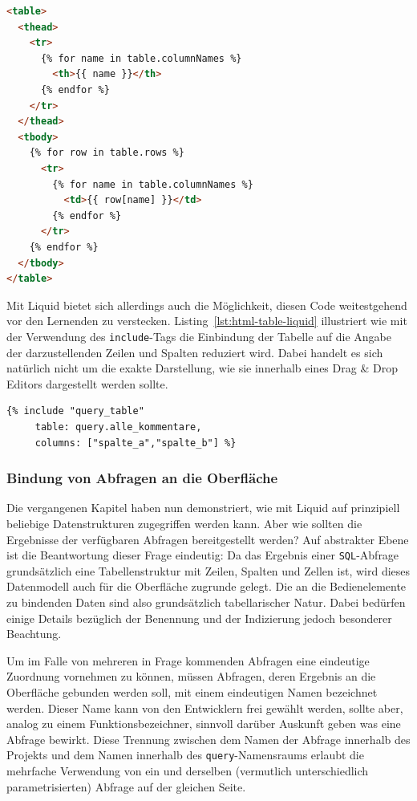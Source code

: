\begin{lstlisting}[language=html,float=h,caption={Code für eine \texttt{HTML}-Tabelle mit Datenanbindung}, label={lst:html-table-pure}]
<table>
  <thead>
    <tr>
      {% for name in table.columnNames %}
        <th>{{ name }}</th>
      {% endfor %}
    </tr>
  </thead>
  <tbody>
    {% for row in table.rows %}
      <tr>
        {% for name in table.columnNames %}
          <td>{{ row[name] }}</td>
        {% endfor %}
      </tr>
    {% endfor %}
  </tbody>
</table>
\end{lstlisting}

Mit Liquid bietet sich allerdings auch die Möglichkeit, diesen Code weitestgehend vor den Lernenden zu verstecken. Listing~\ref{lst:html-table-liquid} illustriert wie mit der Verwendung des \texttt{include}-Tags die Einbindung der Tabelle auf die Angabe der darzustellenden Zeilen und Spalten reduziert wird. Dabei handelt es sich natürlich nicht um die exakte Darstellung, wie sie innerhalb eines Drag \& Drop Editors dargestellt werden sollte.

\begin{lstlisting}[language=html,float=h,caption={Code für eine Liquid-Tabelle mit Datenanbindung}, label={lst:html-table-liquid}]
{% include "query_table" 
     table: query.alle_kommentare,
     columns: ["spalte_a","spalte_b"] %}
\end{lstlisting}

\subsubsection{Bindung von Abfragen an die Oberfläche}
\label{sec:design-ui-bind-output}

Die vergangenen Kapitel haben nun demonstriert, wie mit Liquid auf prinzipiell beliebige Datenstrukturen zugegriffen werden kann. Aber wie sollten die Ergebnisse der verfügbaren Abfragen bereitgestellt werden? Auf abstrakter Ebene ist die Beantwortung dieser Frage eindeutig: Da das Ergebnis einer \texttt{SQL}-Abfrage grundsätzlich eine Tabellenstruktur mit Zeilen, Spalten und Zellen ist, wird dieses Datenmodell auch für die Oberfläche zugrunde gelegt. Die an die Bedienelemente zu bindenden Daten sind also grundsätzlich tabellarischer Natur. Dabei bedürfen einige Details bezüglich der Benennung und der Indizierung jedoch besonderer Beachtung.

Um im Falle von mehreren in Frage kommenden Abfragen eine eindeutige Zuordnung vornehmen zu können, müssen Abfragen, deren Ergebnis an die Oberfläche gebunden werden soll, mit einem eindeutigen Namen bezeichnet werden. Dieser Name kann von den Entwicklern frei gewählt werden, sollte aber, analog zu einem Funktionsbezeichner, sinnvoll darüber Auskunft geben was eine Abfrage bewirkt. Diese Trennung zwischen dem Namen der Abfrage innerhalb des Projekts und dem Namen innerhalb des \texttt{query}-Namensraums erlaubt die mehrfache Verwendung von ein und derselben (vermutlich unterschiedlich parametrisierten) Abfrage auf der gleichen Seite.

